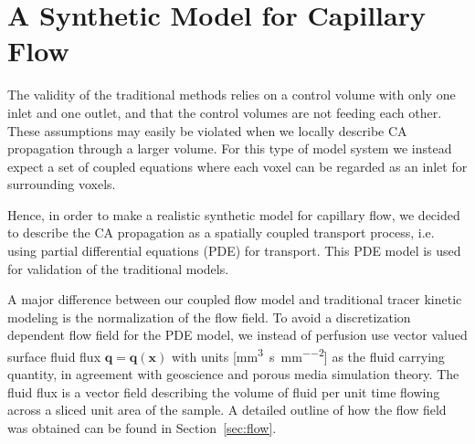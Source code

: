 \documentclass[journal,twocolumn]{IEEEtran}
\newcommand{\vq}{\mathbf{q}}
\newcommand{\vx}{\mathbf{x}}
\newcommand{\siQmm}{\milli\meter\cubed\per\second\per\milli\meter\cubed}
\newcommand{\siq}{\milli\meter\cubed\per\second\per\milli\meter\squared}
\begin{document}
	
	
	\section{A Synthetic Model for Capillary Flow}\label{sec:synthetic}

	The validity of the traditional methods relies on a control volume with only one inlet and one outlet, and that the control volumes are not feeding each other.
	These assumptions may easily be violated when we locally describe CA propagation through a larger volume.
	For this type of model system we instead expect a set of coupled equations where each voxel can be regarded as an inlet for surrounding voxels.

	Hence, in order to make a realistic synthetic model for capillary flow, we decided to describe the CA propagation as a spatially coupled transport process, i.e. using partial differential equations (PDE) for transport. This PDE model is used for validation of the traditional models. 

	
	A major difference between our coupled flow model and traditional tracer kinetic modeling is the normalization of the flow field.
	To avoid a discretization dependent flow field for the PDE model, we instead of perfusion use vector valued surface fluid flux $\vq = \vq(\vx)$ with units [\si{\siq}] as the fluid carrying quantity, in agreement with geoscience and porous media simulation theory.
	The fluid flux is a vector field describing the volume of fluid per unit time flowing across a sliced unit area of the sample.
	A detailed outline of how the flow field was obtained can be found in Section~\ref{sec:flow}.



			

\end{document}
